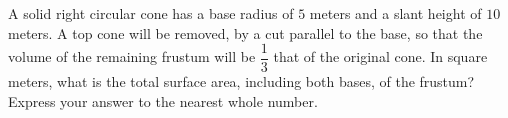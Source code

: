 A solid right circular cone has a base radius of $5$ meters and a slant height of $10$ meters. A top cone will be removed, by a cut parallel to the base, so that the volume of the remaining frustum will be $\dfrac{1}{3}$ that of the original cone. In square meters, what is the total surface area, including both bases, of the frustum? Express your answer to the nearest whole number.

